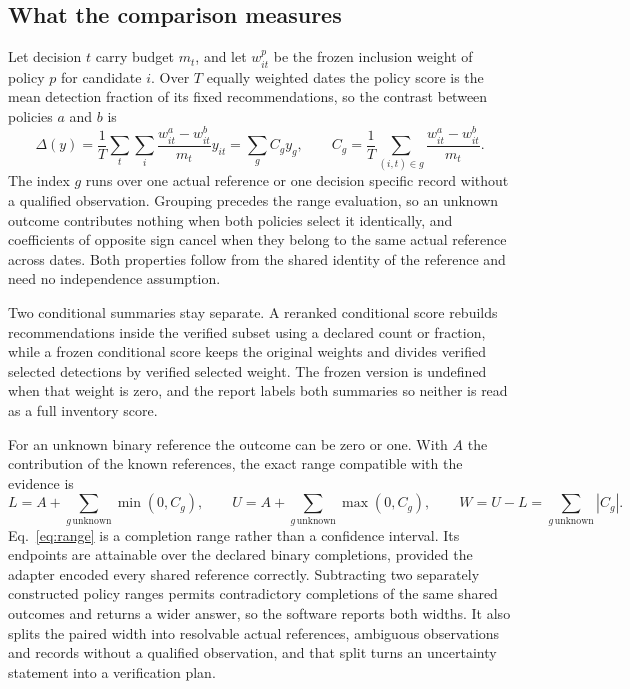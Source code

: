 \documentclass[a4paper,fleqn,longmktitle]{cas-sc}
\begin{document}
\subsection{What the comparison measures}\label{sec:measure}

Let decision \(t\) carry budget \(m_t\), and let \(w^p_{it}\) be the frozen inclusion weight of policy \(p\) for candidate \(i\). Over \(T\) equally weighted dates the policy score is the mean detection fraction of its fixed recommendations, so the contrast between policies \(a\) and \(b\) is
\begin{equation}
\Delta(y)=\frac{1}{T}\sum_t\sum_i\frac{w^a_{it}-w^b_{it}}{m_t}y_{it}
          =\sum_g C_g y_g, \qquad
C_g=\frac{1}{T}\sum_{(i,t)\in g}\frac{w^a_{it}-w^b_{it}}{m_t}.\label{eq:delta}
\end{equation}
The index \(g\) runs over one actual reference or one decision specific record without a qualified observation. Grouping precedes the range evaluation, so an unknown outcome contributes nothing when both policies select it identically, and coefficients of opposite sign cancel when they belong to the same actual reference across dates. Both properties follow from the shared identity of the reference and need no independence assumption.

Two conditional summaries stay separate. A reranked conditional score rebuilds recommendations inside the verified subset using a declared count or fraction, while a frozen conditional score keeps the original weights and divides verified selected detections by verified selected weight. The frozen version is undefined when that weight is zero, and the report labels both summaries so neither is read as a full inventory score.

For an unknown binary reference the outcome can be zero or one. With \(A\) the contribution of the known references, the exact range compatible with the evidence is
\begin{equation}
L=A+\sum_{g\,\mathrm{unknown}}\min(0,C_g),\qquad
U=A+\sum_{g\,\mathrm{unknown}}\max(0,C_g),\qquad
W=U-L=\sum_{g\,\mathrm{unknown}}|C_g|.\label{eq:range}
\end{equation}
Eq.~\eqref{eq:range} is a completion range rather than a confidence interval. Its endpoints are attainable over the declared binary completions, provided the adapter encoded every shared reference correctly. Subtracting two separately constructed policy ranges permits contradictory completions of the same shared outcomes and returns a wider answer, so the software reports both widths. It also splits the paired width into resolvable actual references, ambiguous observations and records without a qualified observation, and that split turns an uncertainty statement into a verification plan.
\end{document}
